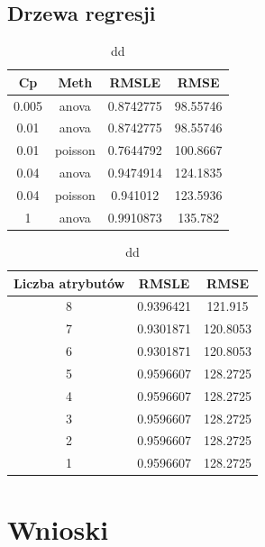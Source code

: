 \documentclass[a4paper,12pt]{article}
\begin{document}
    \subsection{Drzewa regresji}
		\begin{table}
			\begin{tabular}{|c|c|c|c|}
				\hline 
				Cp & Meth & RMSLE & RMSE \\ 
				\hline 
				0.005 & anova & 0.8742775 & 98.55746 \\ 
				\hline 
				0.01 & anova & 0.8742775 & 98.55746 \\ 
				\hline 
				0.01 & poisson & 0.7644792 & 100.8667 \\ 
				\hline 
				0.04 & anova & 0.9474914 & 124.1835 \\ 
				\hline 
				0.04 & poisson & 0.941012 & 123.5936 \\ 
				\hline 
				1 & anova & 0.9910873 & 135.782 \\ 
				\hline 
			\end{tabular} 
			\caption{dd}
		\end{table}
		
		\begin{table}
			\begin{tabular}{|c|c|c|}
				\hline 
				Liczba atrybutów & RMSLE & RMSE \\ 
				\hline 
				8 & 0.9396421 & 121.915 \\ 
				\hline 
				7 & 0.9301871 & 120.8053 \\ 
				\hline 
				6 & 0.9301871 & 120.8053 \\ 
				\hline 
				5 & 0.9596607 & 128.2725 \\ 
				\hline 
				4 & 0.9596607 & 128.2725 \\ 
				\hline 
				3 & 0.9596607 & 128.2725 \\ 
				\hline 
				2 & 0.9596607 & 128.2725 \\ 
				\hline 
				1 & 0.9596607 & 128.2725 \\ 
				\hline 
			\end{tabular} 
			\caption{dd}
		\end{table}
\section{Wnioski}
\end{document}
